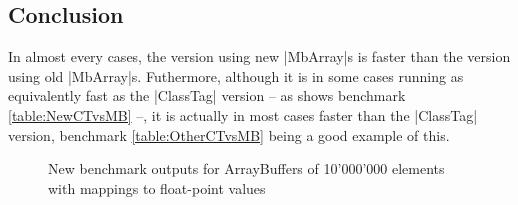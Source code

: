 \subsection{Conclusion}

In almost every cases, the version using new |MbArray|s is faster than the version using old |MbArray|s. Futhermore, although it is in some cases running as equivalently fast as the |ClassTag| version -- as shows benchmark \ref{table:NewCTvsMB} --, it is actually in most cases faster than the |ClassTag| version, benchmark \ref{table:OtherCTvsMB} being a good example of this. 



\begin{figure}
\caption{New benchmark outputs for ArrayBuffers of 10'000'000 elements with mappings to float-point values}
\label{fig:OtherGcComp}
\end{figure}